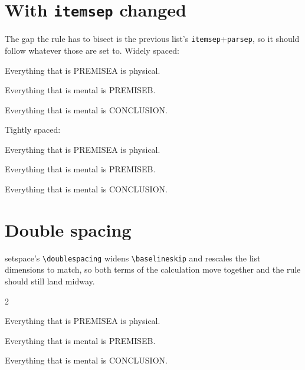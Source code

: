 \documentclass{article}
\newcommand\PA{PREMISEA}
\newcommand\PB{PREMISEB}
\newcommand\CC{CONCLUSION}
\begin{document}
\section{With \texttt{itemsep} changed}

The gap the rule has to bisect is the previous list's
\texttt{itemsep}+\texttt{parsep}, so it should follow whatever those are set
to.  Widely spaced:

\begin{prop}[itemsep=14pt]
  \item Everything that is \PA{} is physical.
  \item Everything that is mental is \PB.
\end{prop}
\begin{prop}[style=conclusion, continue=true, itemsep=14pt]
  \item Everything that is mental is \CC.
\end{prop}

Tightly spaced:

\begin{prop}[itemsep=0pt, parsep=0pt]
  \item Everything that is \PA{} is physical.
  \item Everything that is mental is \PB.
\end{prop}
\begin{prop}[style=conclusion, continue=true, itemsep=0pt, parsep=0pt]
  \item Everything that is mental is \CC.
\end{prop}

\section{Double spacing}

\textsf{setspace}'s \verb|\doublespacing| widens \verb|\baselineskip| and rescales
the list dimensions to match, so both terms of the calculation move together
and the rule should still land midway.

\begin{spacing}{2}
\begin{prop}
  \item Everything that is \PA{} is physical.
  \item Everything that is mental is \PB.
\end{prop}
\begin{prop}[style=conclusion, continue=true]
  \item Everything that is mental is \CC.
\end{prop}
\end{spacing}
\end{document}
